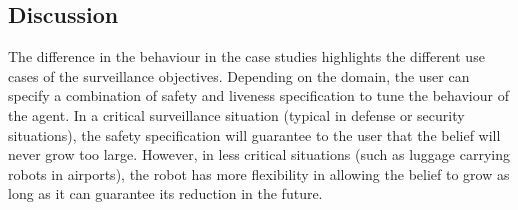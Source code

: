  



\subsection{Discussion}
 The difference in the behaviour in the case studies highlights the different use cases of the surveillance objectives. Depending on the domain, the user can specify a combination of safety and liveness specification to tune the behaviour of the agent. In a critical surveillance situation (typical in defense or security situations), the safety specification will guarantee to the user that the belief will never grow too large. However, in less critical situations (such as luggage carrying robots in airports), the robot has more flexibility in allowing the belief to grow as long as it can guarantee its reduction in the future. 